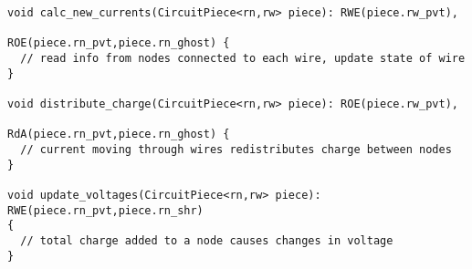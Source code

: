 \begin{lstlisting}[float,caption={Circuit Simulation Code Example}]
void calc_new_currents(CircuitPiece<rn,rw> piece): RWE(piece.rw_pvt),
                                                                         ROE(piece.rn_pvt,piece.rn_ghost) {
  // read info from nodes connected to each wire, update state of wire
}

void distribute_charge(CircuitPiece<rn,rw> piece): ROE(piece.rw_pvt),
                                                                         RdA(piece.rn_pvt,piece.rn_ghost) {
  // current moving through wires redistributes charge between nodes
}

void update_voltages(CircuitPiece<rn,rw> piece): RWE(piece.rn_pvt,piece.rn_shr)
{
  // total charge added to a node causes changes in voltage
}
\end{lstlisting}

